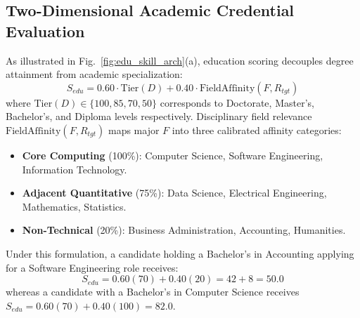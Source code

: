\documentclass[conference]{IEEEtran}
\begin{document}
\subsection{Two-Dimensional Academic Credential Evaluation}
As illustrated in Fig.~\ref{fig:edu_skill_arch}(a), education scoring decouples degree attainment from academic specialization:
\begin{equation}
S_{edu} = 0.60 \cdot \text{Tier}(D) + 0.40 \cdot \text{FieldAffinity}(F, R_{tgt})
\end{equation}
where $\text{Tier}(D) \in \{100, 85, 70, 50\}$ corresponds to Doctorate, Master's, Bachelor's, and Diploma levels respectively. Disciplinary field relevance $\text{FieldAffinity}(F, R_{tgt})$ maps major $F$ into three calibrated affinity categories:
\begin{itemize}
    \item \textbf{Core Computing} (100\%): Computer Science, Software Engineering, Information Technology.
    \item \textbf{Adjacent Quantitative} (75\%): Data Science, Electrical Engineering, Mathematics, Statistics.
    \item \textbf{Non-Technical} (20\%): Business Administration, Accounting, Humanities.
\end{itemize}
Under this formulation, a candidate holding a Bachelor's in Accounting applying for a Software Engineering role receives:
\begin{equation*}
S_{edu} = 0.60(70) + 0.40(20) = 42 + 8 = 50.0
\end{equation*}
whereas a candidate with a Bachelor's in Computer Science receives $S_{edu} = 0.60(70) + 0.40(100) = 82.0$.
\end{document}
